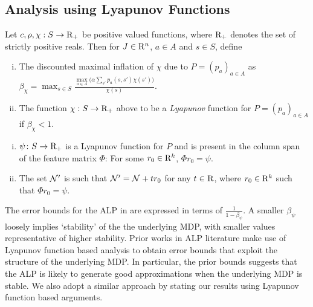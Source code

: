 \subsection{Analysis using Lyapunov Functions}
\begin{definition}
Let $c,\rho,\chi:S \to \mathrm{R}_+$ be positive valued functions, where $\mathrm{R}_+$ denotes the set of strictly positive reals. Then for $J\in \mathrm{R}^n$, $a\in A$ and $s\in S$, define
\begin{enumerate}[(i)]
\item The discounted maximal inflation of $\chi$ due to $P = (p_a)_{a\in A}$ as $\beta_{\chi}=\max_{s \in S} \frac{\underset{a \in A}{\max}\big(\alpha\sum_{s'}p_a(s,s')\chi(s')\big)}{\chi(s)}$.
\item The function $\chi:S\to\mathrm{R}_+$ above to be a \emph{Lyapunov} function for $P = (p_a)_{a\in A}$ if $\beta_{\chi}<1$.
\end{enumerate}
\end{definition}
\begin{assumption}\label{grlpassmp}
\begin{enumerate}[(i)]
\item \label{lyap} $\psi\colon S \rightarrow \mathrm{R}_+$ is a Lyapunov function for $P$
and is present in the column span of the feature matrix $\Phi$: For some $r_0\in \mathrm{R}^k$, $\Phi r_0 = \psi$.
\item \label{ass:n4} The set $\mathcal{N}'$ is such that $\mathcal{N}' = \mathcal{N} + t r_0$ for any $t\in \mathrm{R}$, where $r_0\in \mathrm{R}^k$ such that $\Phi r_0 = \psi$.
\end{enumerate}
\end{assumption}
The error bounds for the ALP in \cite{ALP} are expressed in terms of $\frac{1}{1-\beta_{\psi}}$.  A smaller $\beta_{\psi}$ loosely implies `stability' of the the underlying MDP,  with smaller values representative of higher stability. Prior works in ALP literature \cite{ALP,SALP,CS} make use of Lyapunov function based analysis to obtain error bounds that exploit the structure of the underlying MDP. In particular, the prior bounds suggests that the ALP is likely to generate good approximations when the underlying MDP is stable. We also adopt a similar approach by stating our results using Lyapunov function based arguments.


